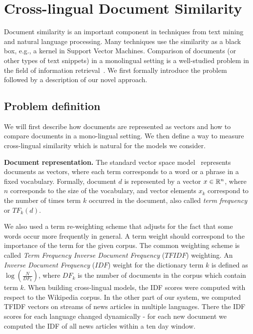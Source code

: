 %
\chapter{Cross-lingual Document Similarity}\label{chap:crosslingual}

Document similarity is an important component in techniques from text mining and natural language processing. 
Many techniques use the similarity as a black box, e.g., a kernel in Support Vector Machines. 
Comparison of documents (or other types of text snippets) in a monolingual setting is a 
well-studied problem in the field of information retrieval~\cite{Salton88term-weightingapproaches}. 
We first formally introduce the problem followed by a description of our novel approach.

\section{Problem definition}\label{chap:crosslingual:problem}
We will first describe how documents are represented as vectors and how to compare documents in 
a mono-lingual setting. We then define a way to measure cross-lingual similarity which is natural 
for the models we consider.

\noindent\textbf{Document representation.}
The standard vector space model~\cite{Salton88term-weightingapproaches} represents documents as 
vectors, where each term corresponds to a word or a phrase in a fixed vocabulary. Formally, 
document $d$ is represented by a vector $x \in \mathbb{R}^n$, where $n$ corresponds to the size 
of the vocabulary, and vector elements $x_k$ correspond to the number of times term $k$ 
occurred in the document, also called \emph{term frequency} or $TF_k(d)$.

We also used a term re-weighting scheme that adjusts for the fact that some words occur 
more frequently in general. A term weight should correspond to the importance of the term 
for the given corpus. The common weighting scheme is called \emph{Term Frequency Inverse 
Document Frequency} ($TFIDF$) weighting. An \emph{Inverse Document Frequency} ($IDF$) weight 
for the dictionary term $k$ is defined as $\log\left( \frac{N}{DF_k} \right)$, where 
$DF_k$ is the number of documents in the corpus which contain term $k$.
When building cross-lingual models, the IDF scores were computed with respect to the 
Wikipedia corpus. In the other part of our system, we computed TFIDF vectors on streams 
of news articles in multiple languages. There the IDF scores for each language changed 
dynamically - for each new document we computed the IDF of all news articles within 
a ten day window.

